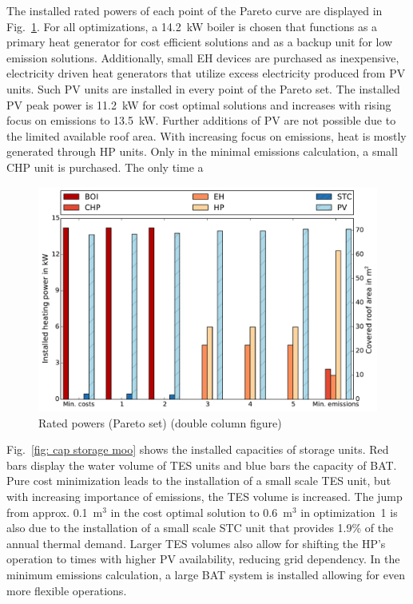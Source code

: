 The installed rated powers of each point of the Pareto curve are displayed in Fig.~\ref{fig: heat generation moo}.
For all optimizations, a 14.2~kW boiler is chosen that functions as a primary heat generator for cost efficient solutions and as a backup unit for low emission solutions.
Additionally, small EH devices are purchased as inexpensive, electricity driven heat generators that utilize excess electricity produced from PV units.
Such PV units are installed in every point of the Pareto set.
The installed PV peak power is 11.2~kW for cost optimal solutions and increases with rising focus on emissions to 13.5~kW.
Further additions of PV are not possible due to the limited available roof area.
With increasing focus on emissions, heat is mostly generated through HP units.
Only in the minimal emissions calculation, a small CHP unit is purchased.
The only time a

\begin{figure}[h!]
	\begin{center}
		\includegraphics[width=\linewidth]{figures/plot_cap_gen_moo.pdf}
		\caption{Rated powers (Pareto set) (double column figure)}
		\label{fig: heat generation moo}
	\end{center}
\end{figure}

Fig.~\ref{fig: cap storage moo} shows the installed capacities of storage units.
Red bars display the water volume of TES units and blue bars the capacity of BAT.
Pure cost minimization leads to the installation of a small scale TES unit, but with increasing importance of emissions, the TES volume is increased.
The jump from approx. 0.1~m$^3$ in the cost optimal solution to 0.6~m$^3$ in optimization~1 is also due to the installation of a small scale STC unit that provides 1.9\% of the annual thermal demand.
Larger TES volumes also allow for shifting the HP's operation to times with higher PV availability, reducing grid dependency.
In the minimum emissions calculation, a large BAT system is installed allowing for even more flexible operations.

